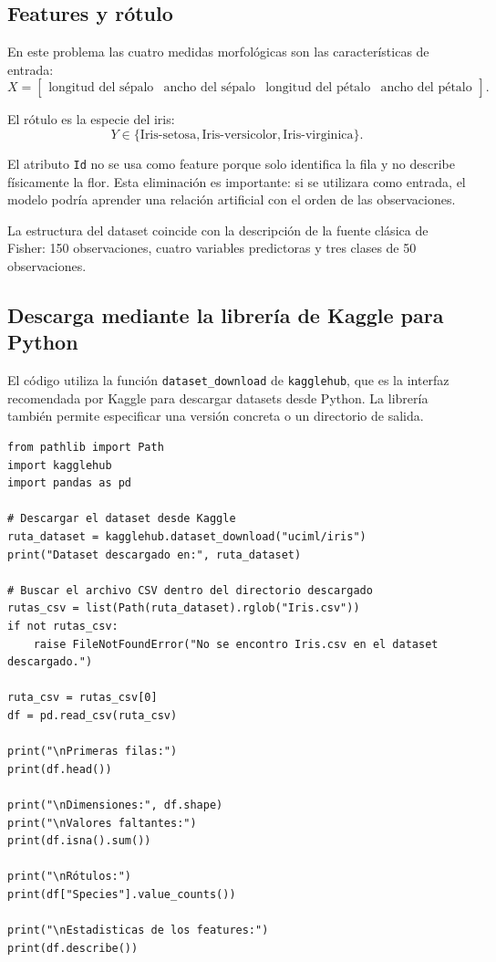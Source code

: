 \documentclass[14pt,twoside]{article}
\begin{document}
\subsection{Features y rótulo}

En este problema las cuatro medidas morfológicas son las características de entrada:
\[
X=\begin{bmatrix}
\text{longitud del sépalo} &
\text{ancho del sépalo} &
\text{longitud del pétalo} &
\text{ancho del pétalo}
\end{bmatrix}.
\]

El rótulo es la especie del iris:
\[
Y\in\{\text{Iris-setosa},\text{Iris-versicolor},\text{Iris-virginica}\}.
\]

El atributo \texttt{Id} no se usa como feature porque solo identifica la fila y no describe físicamente la flor. Esta eliminación es importante: si se utilizara como entrada, el modelo podría aprender una relación artificial con el orden de las observaciones.

La estructura del dataset coincide con la descripción de la fuente clásica de Fisher: 150 observaciones, cuatro variables predictoras y tres clases de 50 observaciones. \cite{kaggleiris,irisexternal}

\subsection{Descarga mediante la librería de Kaggle para Python}

El código utiliza la función \texttt{dataset\_download} de \texttt{kagglehub}, que es la interfaz recomendada por Kaggle para descargar datasets desde Python. La librería también permite especificar una versión concreta o un directorio de salida. \cite{kagglehub}

\begin{lstlisting}[style=pgpython,caption={Descarga y exploración del dataset Iris desde Kaggle.}]
from pathlib import Path
import kagglehub
import pandas as pd

# Descargar el dataset desde Kaggle
ruta_dataset = kagglehub.dataset_download("uciml/iris")
print("Dataset descargado en:", ruta_dataset)

# Buscar el archivo CSV dentro del directorio descargado
rutas_csv = list(Path(ruta_dataset).rglob("Iris.csv"))
if not rutas_csv:
    raise FileNotFoundError("No se encontro Iris.csv en el dataset descargado.")

ruta_csv = rutas_csv[0]
df = pd.read_csv(ruta_csv)

print("\nPrimeras filas:")
print(df.head())

print("\nDimensiones:", df.shape)
print("\nValores faltantes:")
print(df.isna().sum())

print("\nRótulos:")
print(df["Species"].value_counts())

print("\nEstadisticas de los features:")
print(df.describe())
\end{lstlisting}
\end{document}
